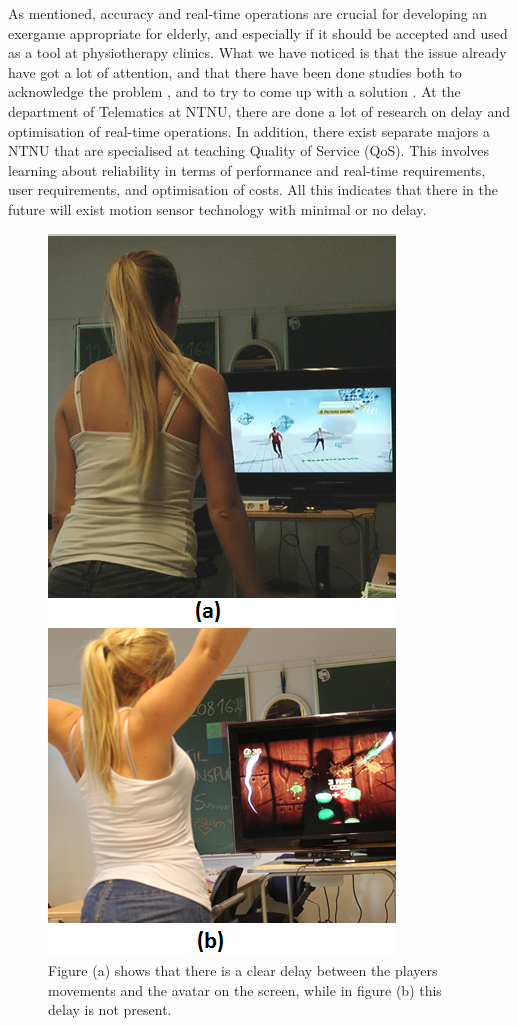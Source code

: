 As mentioned, accuracy and real-time operations are crucial for developing an exergame appropriate for elderly, and especially if it should be accepted and used as a tool at physiotherapy clinics. What we have noticed is that the issue already have got a lot of attention, and that there have been done studies both to acknowledge the problem \cite{leyvand2011kinect}, and to try to come up with a solution \cite{artikkelKinectLag}. At the department of Telematics at NTNU, there are done a lot of research on delay and optimisation of real-time operations. In addition, there exist separate majors a NTNU that are specialised at teaching Quality of Service (QoS). This involves learning about reliability in terms of performance and real-time requirements, user requirements, and optimisation of costs. All this indicates that there in the future will exist motion sensor technology with minimal or no delay. 

\begin{figure} [H]
\centering
\includegraphics[scale=0.8]{delayx2.jpg}
\caption[Kinect sensor delay]{Figure (a) shows that there is a clear delay between the players movements and the avatar on the screen, while in figure (b) this delay is not present.}
\label{fig:remakeDelay}
\end{figure} 

